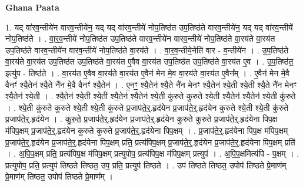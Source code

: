 \documentclass[17pt]{extarticle}
\begin{document}
\textbf{Ghana Paata } \newline

1. यद् वा॑रव॒न्तीये॑न वारव॒न्तीये॑न॒ यद् यद् वा॑रव॒न्तीये॑ नोप॒तिष्ठ॑त उप॒तिष्ठ॑ते वारव॒न्तीये॑न॒ यद् यद् वा॑रव॒न्तीये॑ नोप॒तिष्ठ॑ते । . वा॒र॒व॒न्तीये॑ नोप॒तिष्ठ॑त उप॒तिष्ठ॑ते वारव॒न्तीये॑न वारव॒न्तीये॑ नोप॒तिष्ठ॑ते वा॒रय॑ते वा॒रय॑त उप॒तिष्ठ॑ते वारव॒न्तीये॑न वारव॒न्तीये॑ नोप॒तिष्ठ॑ते वा॒रय॑ते । . वा॒र॒व॒न्तीये॒नेति॑ वार - व॒न्तीये॑न । . उ॒प॒तिष्ठ॑ते वा॒रय॑ते वा॒रय॑त उप॒तिष्ठ॑त उप॒तिष्ठ॑ते वा॒रय॑त ए॒वैव वा॒रय॑त उप॒तिष्ठ॑त उप॒तिष्ठ॑ते वा॒रय॑त ए॒व । . उ॒प॒तिष्ठ॑त॒ इत्यु॑प - तिष्ठ॑ते । . वा॒रय॑त ए॒वैव वा॒रय॑ते वा॒रय॑त ए॒वैन॑ मेन मे॒व वा॒रय॑ते वा॒रय॑त ए॒वैन᳚म् । . ए॒वैन॑ मेन मे॒वै वैनꣳ॑ श्यै॒तेन॑ श्यै॒ते नै॑न मे॒वै वैनꣳ॑ श्यै॒तेन॑ । . ए॒नꣳ॒॒ श्यै॒तेन॑ श्यै॒ते नै॑न मेनꣳ श्यै॒तेन॑ श्ये॒ती श्ये॒ती श्यै॒ते नै॑न मेनꣳ श्यै॒तेन॑ श्ये॒ती । . श्यै॒तेन॑ श्ये॒ती श्ये॒ती श्यै॒तेन॑ श्यै॒तेन॑ श्ये॒ती कु॑रुते कुरुते श्ये॒ती श्यै॒तेन॑ श्यै॒तेन॑ श्ये॒ती कु॑रुते । . श्ये॒ती कु॑रुते कुरुते श्ये॒ती श्ये॒ती कु॑रुते प्र॒जाप॑ते॒र्॒.हृद॑येन प्र॒जाप॑ते॒र्॒.हृद॑येन कुरुते श्ये॒ती श्ये॒ती कु॑रुते प्र॒जाप॑ते॒र्॒.हृद॑येन । . कु॒रु॒ते॒ प्र॒जाप॑ते॒र्॒.हृद॑येन प्र॒जाप॑ते॒र्॒.हृद॑येन कुरुते कुरुते प्र॒जाप॑ते॒र्॒.हृद॑येना पिप॒क्ष म॑पिप॒क्षम् प्र॒जाप॑ते॒र्॒.हृद॑येन कुरुते कुरुते प्र॒जाप॑ते॒र्॒.हृद॑येना पिप॒क्षम् । . प्र॒जाप॑ते॒र्॒.हृद॑येना पिप॒क्ष म॑पिप॒क्षम् प्र॒जाप॑ते॒र्॒.हृद॑येन प्र॒जाप॑ते॒र्॒.हृद॑येना पिप॒क्षम् प्रति॒ प्रत्य॑पिप॒क्षम् प्र॒जाप॑ते॒र्॒.हृद॑येन प्र॒जाप॑ते॒र्॒.हृद॑येना पिप॒क्षम् प्रति॑ । . अ॒पि॒प॒क्षम् प्रति॒ प्रत्य॑पिप॒क्ष म॑पिप॒क्षम् प्रत्युपोप॒ प्रत्य॑पिप॒क्ष म॑पिप॒क्षम् प्रत्युप॑ । . अ॒पि॒प॒क्षमित्य॑पि - प॒क्षम् । . प्रत्युपोप॒ प्रति॒ प्रत्युप॑ तिष्ठते तिष्ठत॒ उप॒ प्रति॒ प्रत्युप॑ तिष्ठते । . उप॑ तिष्ठते तिष्ठत॒ उपोप॑ तिष्ठते प्रे॒माण॑म् प्रे॒माण॑म् तिष्ठत॒ उपोप॑ तिष्ठते प्रे॒माण᳚म् । \newline
\end{document}
